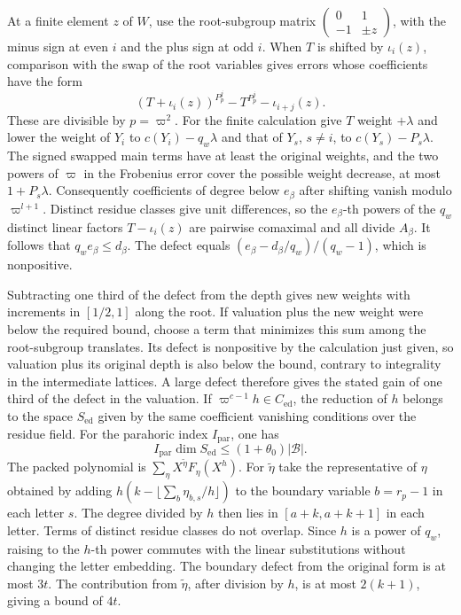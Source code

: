 At a finite element \(z\) of \(W\), use the root-subgroup matrix
\(\left(\begin{smallmatrix}0&1\\-1&\pm z\end{smallmatrix}\right)\),
with the minus sign at even \(i\) and the plus sign at odd \(i\).
When \(T\) is shifted by \(\iota_i(z)\), comparison with the swap of
the root variables gives errors whose coefficients have the form
\[
 (T+\iota_i(z))^{P_p^j}-T^{P_p^j}-\iota_{i+j}(z).
\]
These are divisible by \(p=\varpi^2\).
For the finite calculation give \(T\) weight \(+\lambda\) and
lower the weight of \(Y_i\) to \(c(Y_i)-q_w\lambda\) and that of
\(Y_s\), \(s\ne i\), to \(c(Y_s)-P_s\lambda\).
The signed swapped main terms have at least the original weights,
and the two powers of \(\varpi\) in the Frobenius error cover
the possible weight decrease, at most \(1+P_s\lambda\).
Consequently coefficients of degree below \(e_\beta\) after shifting
vanish modulo \(\varpi^{l+1}\).
Distinct residue classes give unit differences, so the \(e_\beta\)-th
powers of the \(q_w\) distinct linear factors \(T-\iota_i(z)\) are
pairwise comaximal and all divide \(A_\beta\).
It follows that \(q_we_\beta\le d_\beta\). The defect equals
\((e_\beta-d_\beta/q_w)/(q_w-1)\), which is nonpositive.

Subtracting one third of the defect from the depth gives new
weights with increments in \([1/2,1]\) along the root.
If valuation plus the new weight were below the required bound,
choose a term that minimizes this sum among the root-subgroup
translates. Its defect is nonpositive by the calculation just
given, so valuation plus its original depth is also below the
bound, contrary to integrality in the intermediate lattices.
A large defect therefore gives the stated gain of one third of
the defect in the valuation.
If \(\varpi^{c-1}h\in C_\mathrm{ed}\), the reduction of \(h\) belongs to
the space \(S_\mathrm{ed}\) given by the same coefficient vanishing
conditions over the residue field. For the parahoric index
\(I_\mathrm{par}\), one has
\[
 I_\mathrm{par}\dim S_\mathrm{ed}\le(1+\theta_0)|\mathcal B|.
\]
The packed polynomial is \(\sum_\eta X^{\widetilde\eta}F_\eta(X^h)\).
For \(\widetilde\eta\) take the representative of \(\eta\) obtained
by adding \(h(k-\lfloor\sum_b\eta_{b,s}/h\rfloor)\) to the
boundary variable \(b=r_p-1\) in each letter \(s\).
The degree divided by \(h\) then lies in \([a+k,a+k+1]\) in
each letter. Terms of distinct residue classes do not overlap.
Since \(h\) is a power of \(q_w\), raising to the \(h\)-th power
commutes with the linear substitutions without changing the
letter embedding. The boundary defect from the original form
is at most \(3t\). The contribution from \(\widetilde\eta\), after
division by \(h\), is at most \(2(k+1)\), giving a bound of \(4t\).

